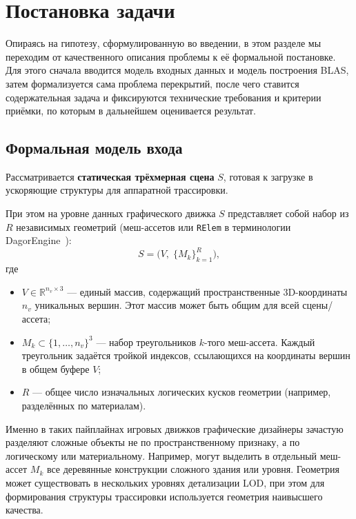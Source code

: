 \section{Постановка задачи}
\label{sec:Chapter1} 

Опираясь на гипотезу, сформулированную во введении, в этом разделе мы переходим от
качественного описания проблемы к её формальной постановке. Для этого сначала
вводится модель входных данных и модель построения BLAS, затем
формализуется сама проблема перекрытий, после чего ставится
содержательная задача и фиксируются технические требования и
критерии приёмки, по которым в дальнейшем оценивается результат.

\subsection{Формальная модель входа}

Рассматривается \textbf{статическая трёхмерная сцена} $S$, готовая к загрузке в ускоряющие структуры для аппаратной трассировки. 

При этом на уровне данных графического движка $S$ представляет собой набор из $R$ независимых геометрий (меш-ассетов или \texttt{RElem} в терминологии DagorEngine~\cite{dagorEngine}):
\begin{equation}
    S = \bigl(V,\; \{M_k\}_{k=1}^{R}\bigr),
\end{equation}
где
\begin{itemize}
    \item $V \in \mathbb{R}^{n_v \times 3}$ --- единый массив, содержащий пространственные 3D-координаты $n_v$ уникальных вершин. Этот массив может быть общим для всей сцены/ассета;
    \item $M_k \subset \{1,\dots,n_v\}^3$ --- набор треугольников $k$-того меш-ассета. Каждый треугольник задаётся тройкой индексов, ссылающихся на координаты вершин в общем буфере $V$;
    \item $R$ --- общее число изначальных логических кусков геометрии (например, разделённых по материалам).
\end{itemize}

Именно в таких пайплайнах игровых движков графические дизайнеры зачастую разделяют сложные объекты не по пространственному признаку, а по логическому или материальному. Например, могут выделить в отдельный меш-ассет $M_k$ все деревянные конструкции сложного здания или уровня. Геометрия может существовать в нескольких уровнях детализации LOD, при этом для формирования структуры трассировки используется геометрия наивысшего качества.

